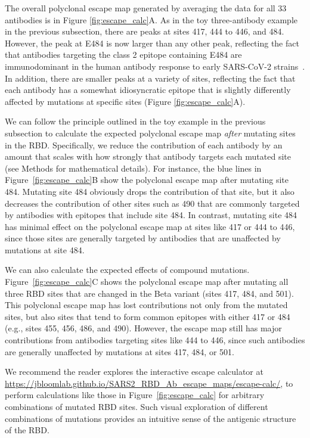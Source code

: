 \documentclass[9pt,twocolumn,twoside]{gsajnl_modified}
\begin{document}
The overall polyclonal escape map generated by averaging the data for all 33 antibodies is in Figure \ref{fig:escape_calc}A.
As in the toy three-antibody example in the previous subsection, there are peaks at  sites 417, 444 to 446, and 484.
However, the peak at E484 is now larger than any other peak, reflecting the fact that antibodies targeting the class 2 epitope containing E484 are immunodominant in the human antibody response to early SARS-CoV-2 strains~\citep{yuan2020structural,robbiani2020convergent,greaney2021comprehensive,greaney2021mapping}.
In addition, there are smaller peaks at a variety of sites, reflecting the fact that each antibody has a somewhat idiosyncratic epitope that is slightly differently affected by mutations at specific sites (Figure \ref{fig:escape_calc}A).

We can follow the principle outlined in the toy example in the previous subsection to calculate the expected polyclonal escape map \emph{after} mutating sites in the RBD.
Specifically, we reduce the contribution of each antibody by an amount that scales with how strongly that antibody targets each mutated site (see Methods for mathematical details).
For instance, the blue lines in Figure~\ref{fig:escape_calc}B show the polyclonal escape map after mutating site 484.
Mutating site 484 obviously drops the contribution of that site, but it also decreases the contribution of other sites such as 490 that are commonly targeted by antibodies with epitopes that include site 484.
In contrast, mutating site 484 has minimal effect on the polyclonal escape map at sites like 417 or 444 to 446, since those sites are generally targeted by antibodies that are unaffected by mutations at site 484.

We can also calculate the expected effects of compound mutations.
Figure~\ref{fig:escape_calc}C shows the polyclonal escape map after mutating all three RBD sites that are changed in the Beta variant (sites 417, 484, and 501).
This polyclonal escape map has lost contributions not only from the mutated sites, but also sites that tend to form common epitopes with either 417 or 484 (e.g., sites 455, 456, 486, and 490).
However, the escape map still has major contributions from antibodies targeting sites like 444 to 446, since such antibodies are generally unaffected by mutations at sites 417, 484, or 501.

We recommend the reader explores the interactive escape calculator at \url{https://jbloomlab.github.io/SARS2_RBD_Ab_escape_maps/escape-calc/}, to perform calculations like those in Figure~\ref{fig:escape_calc} for arbitrary combinations of mutated RBD sites.
Such visual exploration of different combinations of mutations provides an intuitive sense of the antigenic structure of the RBD.
\end{document}
